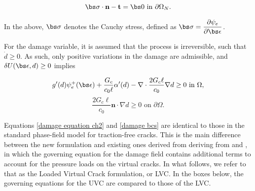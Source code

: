 \begin{equation}\label{disp bcs}
    \bs\sigma \cdot \textbf{n} - \textbf{t} = \bs 0 \text{ in }\partial\Omega_N.
\end{equation}

\noindent In the above, $\bs\sigma$ denotes the Cauchy stress, defined as $\bs\sigma = \dfrac{\partial\psi_e}{\partial \bs \epsilon}$. 

For the damage variable, it is assumed that the process is irreversible, such that $\dot{d} \ge 0$.  As such, only positive variations in the damage are admissible, and $\delta U(\bs\epsilon, d) \ge 0$ implies

\begin{equation}\label{damage equation ch2}
    g'(d) \psi_e^+(\bs\epsilon)
    + \dfrac{G_c}{c_0\ell}\alpha'(d) - \nabla \cdot \dfrac{2G_c\ell}{c_0}\nabla d \ge 0 \text{ in }\Omega,
\end{equation}
\begin{equation}\label{damage bcs}
    \dfrac{2G_c\ell}{c_0}\textbf{n}\cdot \nabla d \ge 0 \text{ on }\partial\Omega.
\end{equation}

\noindent Equations \eqref{damage equation ch2} and \eqref{damage bcs} are identical to those in the standard phase-field model for traction-free cracks. This is the main difference between the new formulation and existing ones derived from deriving from \cite{bourdin2012variational} and \cite{wheeler2014augmented}, in which the governing equation for the damage field contains additional terms to account for the pressure loads on the virtual cracks. In what follows, we refer to that as the Loaded Virtual Crack formulation, or LVC.  In the boxes below, the governing equations for the UVC are compared to those of the LVC.  

